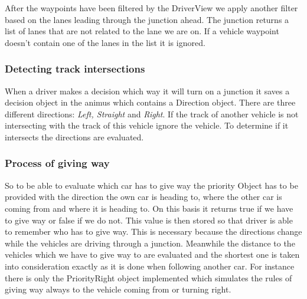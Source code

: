 After the waypoints have been filtered by the DriverView we apply another filter based on 
the lanes leading through the junction ahead. The junction returns a list of lanes that 
are not related to the lane we are on. If a vehicle waypoint doesn't contain one of the 
lanes in the list it is ignored.

\subsubsection{Detecting track intersections}

When a driver makes a decision which way it will turn on a junction it saves a decision 
object in the animus which contains a Direction object. There are three different 
directions: \emph {Left, Straight} and \emph{Right}.
If the track of another vehicle is not intersecting with the track of this vehicle ignore the 
vehicle. To determine if it intersects the directions are evaluated. 

\subsubsection{Process of giving way}
 
So to be able to evaluate which car has to give way the priority Object has to be 
provided with the direction the own car is heading to, where the other car is coming 
from and where it is heading to. On this basis it returns true if we have to give way or 
false if we do not. This value is then stored so that driver is able to remember who has 
to give way. This is necessary because the directions change while the vehicles are driving 
through a junction. Meanwhile the distance to the vehicles which we have to give way to are 
evaluated and the shortest one is taken into consideration exactly as it is done when 
following another car. For instance there is only the PriorityRight object implemented which 
simulates the rules of giving way always to the vehicle coming from or turning right.



